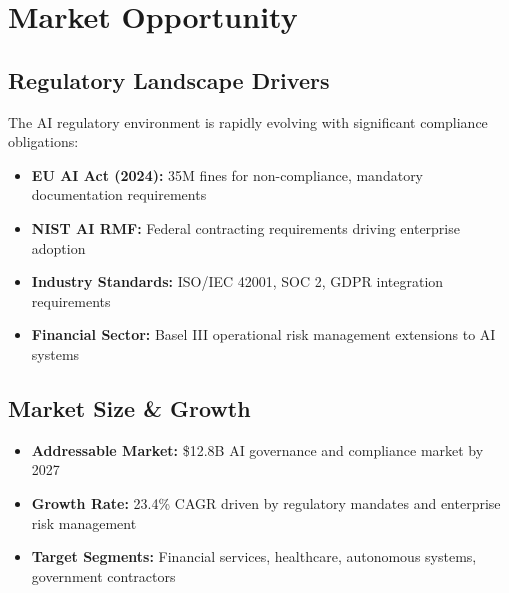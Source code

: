 \documentclass[12pt,a4paper]{article}
\begin{document}
\section{Market Opportunity}

\subsection{Regulatory Landscape Drivers}

The AI regulatory environment is rapidly evolving with significant compliance obligations:

\begin{itemize}
    \item \textbf{EU AI Act (2024):} \texteuro 35M fines for non-compliance, mandatory documentation requirements
    \item \textbf{NIST AI RMF:} Federal contracting requirements driving enterprise adoption
    \item \textbf{Industry Standards:} ISO/IEC 42001, SOC 2, GDPR integration requirements
    \item \textbf{Financial Sector:} Basel III operational risk management extensions to AI systems
\end{itemize}

\subsection{Market Size \& Growth}

\begin{center}
\end{center}

\begin{itemize}
    \item \textbf{Addressable Market:} \$12.8B AI governance and compliance market by 2027
    \item \textbf{Growth Rate:} 23.4\% CAGR driven by regulatory mandates and enterprise risk management
    \item \textbf{Target Segments:} Financial services, healthcare, autonomous systems, government contractors
\end{itemize}
\end{document}
